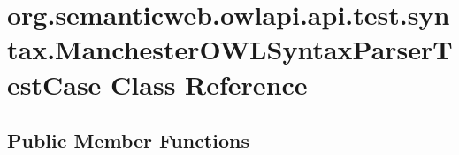 \hypertarget{classorg_1_1semanticweb_1_1owlapi_1_1api_1_1test_1_1syntax_1_1_manchester_o_w_l_syntax_parser_test_case}{\section{org.\-semanticweb.\-owlapi.\-api.\-test.\-syntax.\-Manchester\-O\-W\-L\-Syntax\-Parser\-Test\-Case Class Reference}
\label{classorg_1_1semanticweb_1_1owlapi_1_1api_1_1test_1_1syntax_1_1_manchester_o_w_l_syntax_parser_test_case}
}
\subsection*{Public Member Functions}
